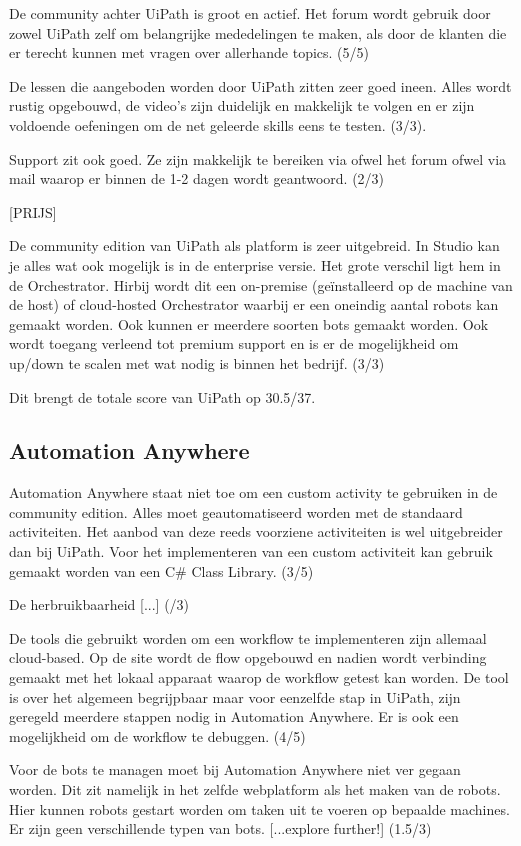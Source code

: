 De community achter UiPath is groot en actief. Het forum wordt gebruik door zowel UiPath zelf om belangrijke mededelingen te maken, als door de klanten die er terecht kunnen met vragen over allerhande topics. (5/5)

De lessen die aangeboden worden door UiPath zitten zeer goed ineen. Alles wordt rustig opgebouwd, de video's zijn duidelijk en makkelijk te volgen en er zijn voldoende oefeningen om de net geleerde skills eens te testen. (3/3).

Support zit ook goed. Ze zijn makkelijk te bereiken via ofwel het forum ofwel via mail waarop er binnen de 1-2 dagen wordt geantwoord. (2/3)

[PRIJS]

De community edition van UiPath als platform is zeer uitgebreid. In Studio kan je alles wat ook mogelijk is in de enterprise versie. Het grote verschil ligt hem in de Orchestrator. Hirbij wordt dit een on-premise (geïnstalleerd op de machine van de host) of cloud-hosted Orchestrator waarbij er een oneindig aantal robots kan gemaakt worden. Ook kunnen er meerdere soorten bots gemaakt worden. Ook wordt toegang verleend tot premium support en is er de mogelijkheid om up/down te scalen met wat nodig is binnen het bedrijf. (3/3)

Dit brengt de totale score van UiPath op 30.5/37.

\subsection{Automation Anywhere}
Automation Anywhere staat niet toe om een custom activity te gebruiken in de community edition. Alles moet geautomatiseerd worden met de standaard activiteiten. Het aanbod van deze reeds voorziene activiteiten is wel uitgebreider dan bij UiPath. Voor het implementeren van een custom activiteit kan gebruik gemaakt worden van een C\# Class Library. (3/5)

De herbruikbaarheid [...] (/3)

De tools die gebruikt worden om een workflow te implementeren zijn allemaal cloud-based. Op de site wordt de flow opgebouwd en nadien wordt verbinding gemaakt met het lokaal apparaat waarop de workflow getest kan worden. De tool is over het algemeen begrijpbaar maar voor eenzelfde stap in UiPath, zijn geregeld meerdere stappen nodig in Automation Anywhere. Er is ook een mogelijkheid om de workflow te debuggen. (4/5)

Voor de bots te managen moet bij Automation Anywhere niet ver gegaan worden. Dit zit namelijk in het zelfde webplatform als het maken van de robots. Hier kunnen robots gestart worden om taken uit te voeren op bepaalde machines. Er zijn geen verschillende typen van bots. [...explore further!] (1.5/3)


